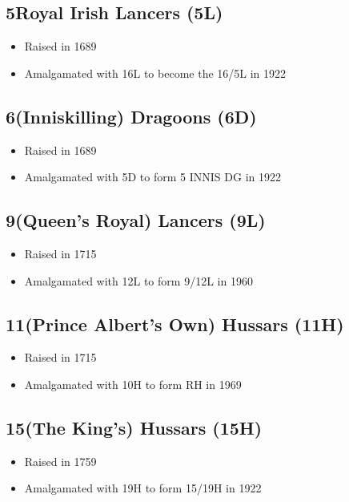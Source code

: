 \subsection*{5\nth Royal Irish Lancers (5L)}

\begin{itemize}
\item Raised in 1689
\item Amalgamated with 16L to become the 16/5L in 1922
\end{itemize}

\subsection*{6\nth (Inniskilling) Dragoons (6D)}

\begin{itemize}
\item Raised in 1689
\item Amalgamated with 5D to form 5 INNIS DG in 1922
\end{itemize}

\subsection*{9\nth (Queen's Royal) Lancers (9L)}

\begin{itemize}
\item Raised in 1715
\item Amalgamated with 12L to form 9/12L in 1960
\end{itemize}

\subsection*{11\nth (Prince Albert's Own) Hussars (11H)}

\begin{itemize}
\item Raised in 1715
\item Amalgamated with 10H to form RH in 1969
\end{itemize}

\subsection*{15\nth (The King's) Hussars (15H)}

\begin{itemize}
\item Raised in 1759
\item Amalgamated with 19H to form 15/19H in 1922
\end{itemize}

